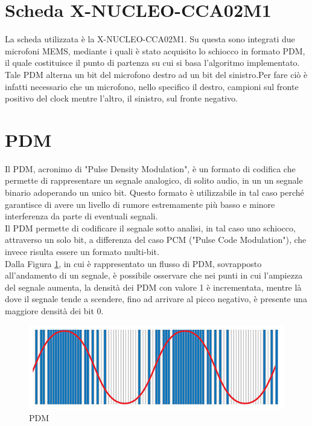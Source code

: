 \documentclass[a4paper, titlepage]{article}
\begin{document}
\section{Scheda  X-NUCLEO-CCA02M1}
La scheda utilizzata è la X-NUCLEO-CCA02M1. Su questa sono integrati due microfoni MEMS, mediante i quali è stato acquisito lo schiocco in formato PDM, il quale costituisce il punto di partenza su cui si basa l'algoritmo implementato.\\
Tale PDM alterna un bit del microfono destro ad un bit del sinistro.Per fare ciò è infatti necessario che un microfono, nello specifico il destro, campioni sul fronte positivo del clock mentre l'altro, il sinistro, sul fronte negativo.

\section{PDM}
Il PDM, acronimo di "Pulse Density Modulation", è un formato di codifica che permette di rappresentare un segnale analogico, di solito audio, in un un segnale binario adoperando un unico bit. Questo formato  è utilizzabile in tal caso perché garantisce di avere un livello di rumore estremamente più basso e minore interferenza da parte di eventuali segnali.\\Il PDM permette di codificare il segnale sotto analisi, in tal caso uno schiocco, attraverso un solo bit, a differenza del caso PCM ("Pulse Code Modulation"), che invece risulta essere un formato multi-bit.\\Dalla Figura \ref{fig:PDM}, in cui è rappresentato un flusso di PDM, sovrapposto all'andamento di un segnale, è possibile osservare che nei punti in cui l'ampiezza del segnale aumenta, la densità dei PDM con valore 1 è incrementata, mentre là dove il segnale tende a scendere, fino ad arrivare al picco negativo, è presente una maggiore densità dei bit 0.
\begin{figure}[H]
    \centering
    \includegraphics[width=1\textwidth]{PDM.jpg}
    \caption{PDM}
    \label{fig:PDM}
\end{figure}
\end{document}
